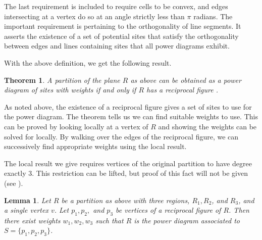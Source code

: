 \documentclass[a4paper, 11pt]{article}
\newtheorem{theorem}{Theorem}[section]
\newtheorem{lemma}{Lemma}[section]
\begin{document}
The last requirement is included to require cells to be convex, and edges intersecting at a vertex do so at an angle strictly less than $\pi$ radians.
The important requirement is pertaining to the orthogonality of line segments. It asserts the existence of a set of potential sites that satisfy the
orthogonality between edges and lines containing sites that all power diagrams exhibit.

With the above definition, we get the following result.

\begin{theorem}
  A partition of the plane $R$ as above can be obtained as a power diagram of sites with weights if and only if $R$ has a reciprocal figure
  \cite{ash-bolker}.
  \label{thm:pow_rec}
\end{theorem}

As noted above, the existence of a reciprocal figure gives a set of sites to use for the power diagram. The theorem tells us we can find suitable
weights to use. This can be proved by looking locally at a vertex of $R$ and showing the weights can be solved for locally. By walking over the edges
of the reciprocal figure, we can successively find appropriate weights using the local result.

The local result we give requires vertices of the original partition to have degree exactly 3. This restriction can be lifted, but proof of this fact
will not be given (see \cite{ash-bolker}).

\begin{lemma}
  Let $R$ be a partition as above with three regions, $R_1, R_2$, and $R_3$, and a single vertex $v$. Let $p_1, p_2,$ and $p_3$ be vertices of a reciprocal figure of $R$. Then there exist weights
  $w_1, w_2, w_3$ such that $R$ is the power diagram associated to $S = \{ p_1, p_2, p_3 \}$.
  \label{lem:rec_loc}
\end{lemma}
\end{document}
